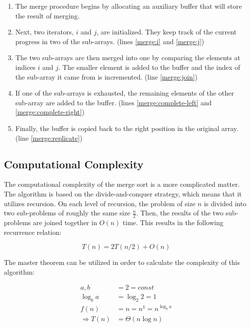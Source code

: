 \documentclass[titlepage, a4paper, 12pt]{article}
\begin{document}
    \begin{enumerate}
        \item The merge procedure begins by allocating an auxiliary buffer that will store the result of merging.
        \item Next, two iterators, $i$ and $j$, are initialized. They keep track of the current progress in two of the sub-arrays. (lines \ref{merge:i} and \ref{merge:j})
        \item The two sub-arrays are then merged into one by comparing the elements at indices $i$ and $j$. The smaller element is added to the buffer and the index of the sub-array it came from is incremented. (line \ref{merge:join})
        \item If one of the sub-arrays is exhausted, the remaining elements of the other sub-array are added to the buffer. (lines \ref{merge:complete-left} and \ref{merge:complete-right})
        \item Finally, the buffer is copied back to the right position in the original array. (line \ref{merge:replicate})
    \end{enumerate}

    \subsection{Computational Complexity}

    The computational complexity of the merge sort is a more complicated matter. The algorithm is based on the divide-and-conquer strategy, which means that it utilizes recursion. On each level of recursion, the problem of size $n$ is divided into two sub-problems of roughly the same size $\frac{n}{2}$. Then, the results of the two sub-problems are joined together in $O(n)$ time. This results in the following recurrence relation:
    
    \begin{equation*}
        T(n) = 2T(n/2) + O(n)
    \end{equation*}

    The master theorem can be utilized in order to calculate the complexity of this algorithm:

    \begin{equation*}
        \begin{aligned}
            a, b &= 2 = const \\
            \log_b a &= \log_2 2 = 1 \\
            f(n) &= n = n^1 = n^{\log_b a} \\
            \Rightarrow T(n) &= \Theta(n \log n)
        \end{aligned}
    \end{equation*}
\end{document}
